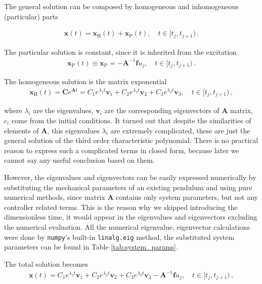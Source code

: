\noindent The general solution can be composed by homogeneous and inhomogeneous (particular) parts

\begin{align}
	\mathbf x(t) = \mathbf x_\mathrm{H}(t) + \mathbf{x}_\mathrm{P}(t),\quad t\in[t_{j},t_{j+1})\,.
\end{align}


\noindent
The particular solution is constant, since it is inherited from the excitation
\begin{align}
	\mathbf{x}_\mathrm{P}(t)\equiv \mathbf{x}_\mathrm{P} = -\mathbf A^{-1} \mathbf f u_j,\quad t\in[t_{j},t_{j+1})\,.
\end{align}

\noindent
The homogeneous solution is the matrix exponential
\begin{align}
	\mathbf x_\mathrm{H}(t)= \mathbf C e^{\displaystyle \mathbf A t} = C_1e^{\displaystyle \lambda_1 t}\mathbf v_1 + C_2 e^{\displaystyle\lambda_2 t}\mathbf v_2 + C_3 e^{\displaystyle\lambda_3 t}\mathbf v_3,\quad t\in[t_{j},t_{j+1})\,,
\end{align}

\noindent where $\lambda_i$ are the eigenvalues, $\mathbf v_i$ are the corresponding eigenvectors of $\mathbf A$ matrix, $c_i$ come from the initial conditions.
It turned out that despite the similarities of elements of $\mathbf A$, this eigenvalues $\lambda_i$ are extremely complicated, these are just the general solution of the third order characteristic polynomial. There is no practical reason to express such a complicated terms in closed form, because later we cannot say any useful conclusion based on them. 

However, the eigenvalues and eigenvectors can be easily expressed numerically by substituting the mechanical parameters of an existing pendulum and using pure numerical methods, since matrix $\mathbf A$ contains only system parameters, but not any controller related terms. This is the reason why we skipped introducing the dimensionless time, it would appear in the eigenvalues and eigenvectors excluding the numerical evaluation.
All the numerical eigenvalue, eigenvector calculations were done by \texttt{numpy}'s built-in \texttt{linalg.eig} method, the substituted system parameters can be found in Table \ref{tab:system_params}.

The total solution becomes
\begin{align}
		\mathbf x(t)
		= 
		C_1e^{\displaystyle \lambda_1 t}\mathbf v_1 
		+ C_2 e^{\displaystyle\lambda_2 t}\mathbf v_2 
		+ C_3 e^{\displaystyle\lambda_3 t}\mathbf v_3
		-\mathbf A^{-1} \mathbf f u_j,\quad t\in[t_{j},t_{j+1})\,,
\end{align}

